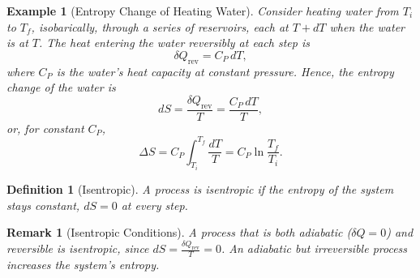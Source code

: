 \documentclass{article}
\newtheorem{definition}{Definition}
\newtheorem{example}{Example}
\newtheorem{remark}{Remark}
\begin{document}
\begin{example}[Entropy Change of Heating Water]
    Consider heating water from $T_i$ to $T_f$, isobarically, through a series of reservoirs, each at $T + dT$ when the water is at $T$. The heat entering the water reversibly at each step is
    \[\delta Q_{\text{rev}} = C_P\,dT,\]
    where $C_P$ is the water's heat capacity at constant pressure. Hence, the entropy change of the water is
    \[dS = \frac{\delta Q_{\text{rev}}}{T} = \frac{C_P\,dT}{T},\]
    or, for constant $C_P$,
    \begin{equation}
        \label{eq:centropy-water}
        \Delta S = C_P\int_{T_i}^{T_f}\frac{dT}{T} = C_P \ln\frac{T_f}{T_i}.
    \end{equation}
\end{example}
\begin{definition}[Isentropic]
    A process is isentropic if the entropy of the system stays constant, $dS = 0$ at every step.
\end{definition}
\begin{remark}[Isentropic Conditions]
    A process that is both adiabatic ($\delta Q = 0$) and reversible is isentropic, since $dS = \frac{\delta Q_{\text{rev}}}{T} = 0$. An adiabatic but irreversible process increases the system's entropy.
\end{remark}
\end{document}
